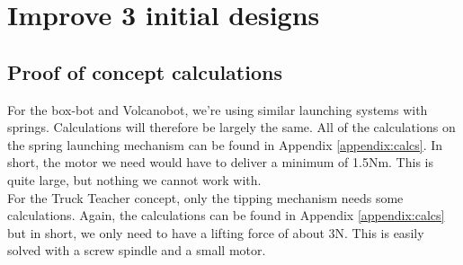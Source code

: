 \documentclass[11pt,twoside,a4paper]{report}
\begin{document}
\chapter{Improve 3 initial designs}
\section{Proof of concept calculations}
For the box-bot and Volcanobot, we’re using similar launching systems with springs. Calculations will therefore be largely the same.
All of the calculations on the spring launching mechanism can be found in Appendix \ref{appendix:calcs}. In short, the motor we need would have to deliver a minimum of 1.5Nm. This is quite large, but nothing we cannot work with.\\
For the Truck Teacher concept, only the tipping mechanism needs some calculations. Again, the calculations can be found in Appendix \ref{appendix:calcs} but in short, we only need to have a lifting force of about 3N. This is easily solved with a screw spindle and a small motor.
\end{document}
